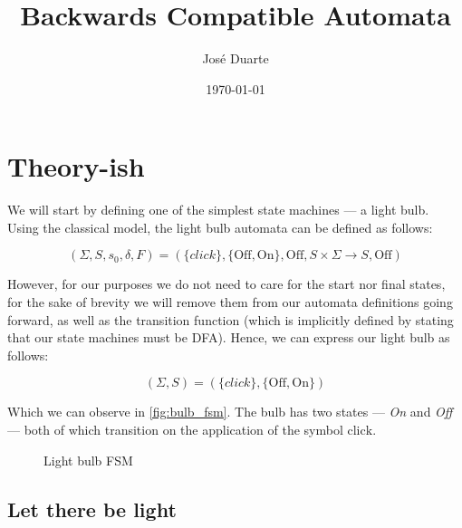 \documentclass[a4paper]{article}
\begin{document}
\title{Backwards Compatible Automata}
\author{José Duarte}
\date{\today}
\maketitle

\section*{Theory-ish}

We will start by defining one of the simplest state machines — a light bulb.
Using the classical model, the light bulb automata can be defined as follows:

\begin{equation}
    (\Sigma, S, s_0, \delta, F) = (\{click\}, \{\text{Off}, \text{On}\}, \text{Off},S \times \Sigma \rightarrow S, \text{Off})
    \label{eq:fsm_long}
\end{equation}

However, for our purposes we do not need to care for the start nor final states,
for the sake of brevity we will remove them from our automata definitions going forward,
as well as the transition function (which is implicitly defined by stating that our state machines must be DFA).
Hence, we can express our light bulb as follows:

\begin{equation}
    (\Sigma, S) = (\{click\}, \{\text{Off}, \text{On}\})
    \label{eq:fsm_short}
\end{equation}

Which we can observe in \autoref{fig:bulb_fsm}.
The bulb has two states — \emph{On} and \emph{Off} — both of which transition on the application of the symbol $\text{click}$.

\begin{figure}[ht]
    \centering
    \caption{Light bulb FSM}
    \label{fig:bulb_fsm}
\end{figure}

\subsection*{Let there be light}
\end{document}
